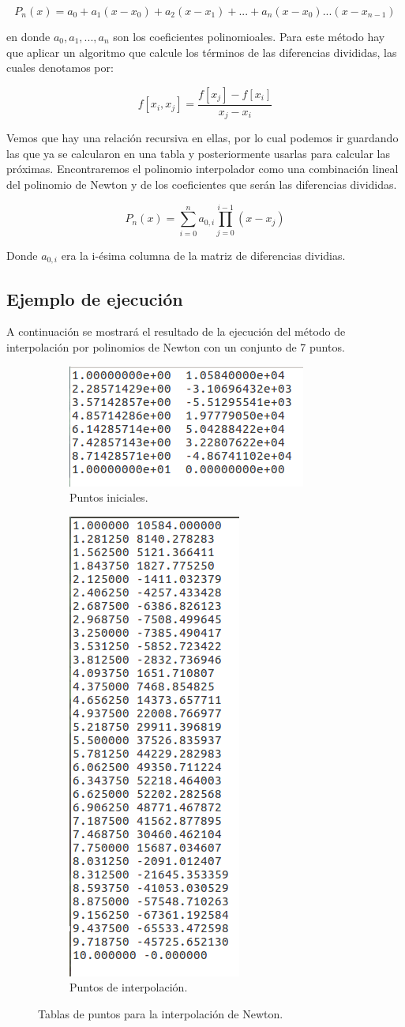 \documentclass[12pt]{article}
\begin{document}
$$P_n(x) = a_0+a_1(x-x_0)+a_2(x-x_1)+...+a_n(x-x_0)...(x-x_{n-1})$$

en donde $a_0,a_1,...,a_n$ son los coeficientes polinomioales. Para este método hay que aplicar un algoritmo que calcule los términos de las diferencias divididas, las cuales denotamos por:

$$f[x_i,x_j]=\frac{f[x_j] - f[x_i]}{x_j - x_i}$$

Vemos que hay una relación recursiva en ellas, por lo cual podemos ir guardando las que ya se calcularon en una tabla y posteriormente usarlas para calcular las próximas. Encontraremos el polinomio interpolador como una combinación lineal del polinomio de Newton y de los coeficientes que serán las diferencias divididas.

$$P_n(x) = \sum_{i=0}^{n}a_{0,i} \prod_{j=0}^{i-1}(x-x_j)$$

Donde $a_{0,i}$ era la i-ésima columna de la matriz de diferencias dividias.

\subsection{Ejemplo de ejecución}
A continuación se mostrará el resultado de la ejecución del método de interpolación por polinomios de Newton con un conjunto de 7 puntos.\\

\begin{figure}[H]
	\centering
	\begin{subfigure}{0.6\textwidth}
		\centering
		\includegraphics[width=.3\linewidth]{E1.png}
		\caption{Puntos iniciales.}
	\end{subfigure}%
	\begin{subfigure}{0.5\textwidth}
		\centering
		\includegraphics[width=.3\linewidth]{E4.png}
		\caption{Puntos de interpolación.}
	\end{subfigure}
	\caption{Tablas de puntos para la interpolación de Newton.}
\end{figure}
\end{document}

